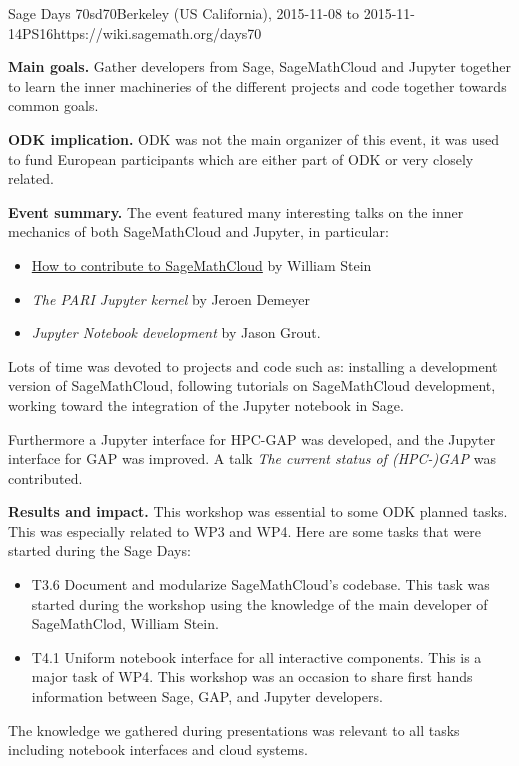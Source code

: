 \begin{event}{Sage Days 70}{sd70}{Berkeley (US California), 2015-11-08 to 2015-11-14}{PS}{16}{https://wiki.sagemath.org/days70}

\textbf{Main goals.} Gather developers from Sage, SageMathCloud and Jupyter together to learn the
inner machineries of the different projects and code together towards common goals.

\textbf{ODK implication.} ODK was not the main organizer of this event, it was used to fund
European participants which are either part of ODK or very closely related.

\textbf{Event summary.} The event featured many interesting talks on the inner mechanics of
both SageMathCloud and Jupyter, in particular:
\begin{itemize}
\item \href{https://youtu.be/GOuy07Kift4}{How to contribute to SageMathCloud} by William Stein
\item \emph{The PARI Jupyter kernel} by Jeroen Demeyer
\item \emph{Jupyter Notebook development} by Jason Grout.
\end{itemize}
Lots of time was devoted to projects and code such as: installing a development version of SageMathCloud,
following tutorials on SageMathCloud development, working toward the integration of the Jupyter notebook
in Sage.

Furthermore a Jupyter interface for HPC-GAP was developed, and the Jupyter
interface for GAP was improved. A talk \emph{The current status of (HPC-)GAP}
was contributed.

\textbf{Results and impact.} 
This workshop was essential to some ODK planned tasks. This was especially related to WP3 and WP4. Here are some tasks that
were started during the Sage Days:
\begin{itemize}
\item T3.6 Document and modularize SageMathCloud's codebase. This task was started during the workshop using the 
knowledge of the main developer of SageMathClod, William Stein.

\item T4.1 Uniform notebook interface for all interactive components. This is a major task of WP4. This workshop
was an occasion to share first hands information between Sage, GAP, and Jupyter developers.

\end{itemize}
The knowledge we gathered during presentations was relevant to all tasks including notebook interfaces and cloud
systems.

\end{event}